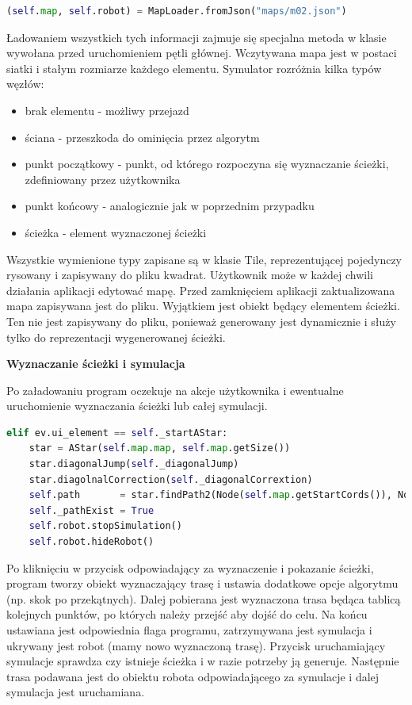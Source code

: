 \begin{lstlisting}[language=Python,caption=Uruchomienie aplikacji,label={kodPythonWczytanieMapy}]
(self.map, self.robot) = MapLoader.fromJson("maps/m02.json")
\end{lstlisting}
Ładowaniem wszystkich tych informacji zajmuje się specjalna metoda w klasie wywołana przed uruchomieniem pętli głównej. 
Wczytywana mapa jest w postaci siatki i stałym rozmiarze każdego elementu. Symulator rozróżnia kilka typów węzłów:
\begin{itemize}
	\item brak elementu - możliwy przejazd 
	\item ściana - przeszkoda do ominięcia przez algorytm
	\item punkt początkowy - punkt, od którego rozpoczyna się wyznaczanie ścieżki, zdefiniowany przez użytkownika
	\item punkt końcowy - analogicznie jak w poprzednim przypadku
	\item ścieżka - element wyznaczonej ścieżki
\end{itemize}

Wszystkie wymienione typy zapisane są w klasie Tile, reprezentującej pojedynczy rysowany i zapisywany do pliku kwadrat.
Użytkownik może w każdej chwili działania aplikacji edytować mapę. Przed zamknięciem aplikacji 
zaktualizowana mapa zapisywana jest do pliku. Wyjątkiem jest obiekt będący elementem ścieżki. 
Ten nie jest zapisywany do pliku, ponieważ generowany jest dynamicznie i służy tylko do reprezentacji wygenerowanej ścieżki.

\textbf{Wyznaczanie ścieżki i symulacja}


Po załadowaniu program oczekuje na akcje użytkownika i ewentualne uruchomienie wyznaczania ścieżki lub całej symulacji.
\begin{lstlisting}[language=Python,caption=Uruchomienie aplikacji,label={kodPythonWyznaczenieSciezki}]
elif ev.ui_element == self._startAStar:
    star = AStar(self.map.map, self.map.getSize())
    star.diagonalJump(self._diagonalJump)
    star.diagolnalCorrection(self._diagonalCorrextion)
    self.path       = star.findPath2(Node(self.map.getStartCords()), Node((self.map.getEndCords())))
    self._pathExist = True
    self.robot.stopSimulation()
    self.robot.hideRobot()
\end{lstlisting}

Po kliknięciu w przycisk odpowiadający za wyznaczenie i pokazanie ścieżki, program tworzy obiekt 
wyznaczający trasę i ustawia dodatkowe opcje algorytmu (np. skok po przekątnych). 
Dalej pobierana jest wyznaczona trasa będąca tablicą kolejnych punktów, po których należy przejść aby dojść do celu.
Na końcu ustawiana jest odpowiednia flaga programu, zatrzymywana jest symulacja i ukrywany jest robot (mamy nowo wyznaczoną trasę).
Przycisk uruchamiający symulacje sprawdza czy istnieje ścieżka i w razie potrzeby ją generuje. Następnie trasa podawana 
jest do obiektu robota odpowiadającego za symulacje i dalej symulacja jest uruchamiana.

